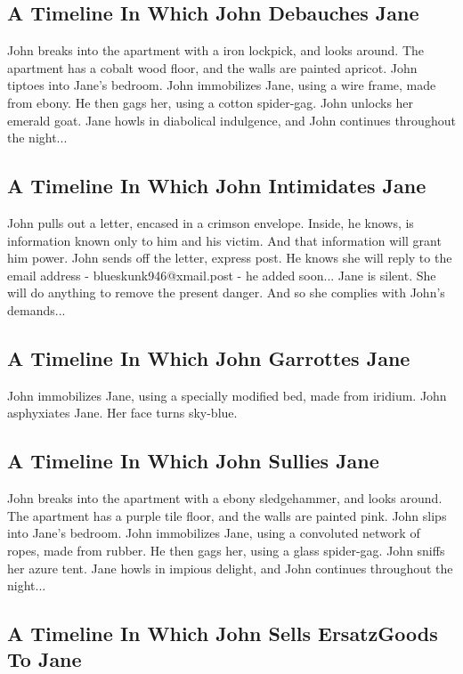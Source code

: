 \documentclass{article}
\begin{document}
\subsection{A Timeline In Which John Debauches Jane}


John breaks into the apartment with a iron lockpick, and looks around.
The apartment has a cobalt wood floor, and the walls are painted apricot.
John tiptoes into Jane's bedroom.
John immobilizes Jane, using a wire frame, made from ebony.
He then gags her, using a cotton spider{-}gag.
John unlocks her emerald goat.
Jane howls in diabolical indulgence, and John continues throughout the night...
\subsection{A Timeline In Which John Intimidates Jane}


John pulls out a letter, encased in a crimson envelope. Inside, he knows, is information known only to him and his victim. And that information will grant him power.
John sends off the letter, express post. He knows she will reply to the email address {-} blueskunk946@xmail.post {-} he added soon...
Jane is silent. She will do anything to remove the present danger. And so she complies with John's demands...
\subsection{A Timeline In Which John Garrottes Jane}


John immobilizes Jane, using a specially modified bed, made from iridium.
John asphyxiates Jane.
Her face turns sky{-}blue.
\subsection{A Timeline In Which John Sullies Jane}


John breaks into the apartment with a ebony sledgehammer, and looks around.
The apartment has a purple tile floor, and the walls are painted pink.
John slips into Jane's bedroom.
John immobilizes Jane, using a convoluted network of ropes, made from rubber.
He then gags her, using a glass spider{-}gag.
John sniffs her azure tent.
Jane howls in impious delight, and John continues throughout the night...
\subsection{A Timeline In Which John Sells ErsatzGoods To Jane}
\end{document}
